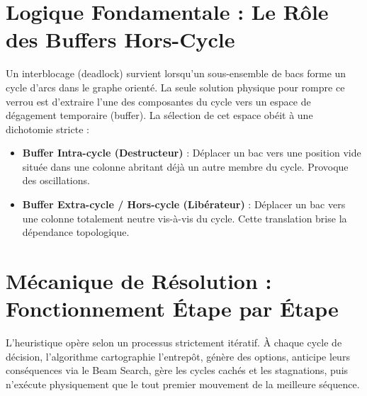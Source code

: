 \documentclass[11pt,a4paper]{article}
\begin{document}
\section{Logique Fondamentale : Le Rôle des Buffers Hors-Cycle}
Un interblocage (deadlock) survient lorsqu'un sous-ensemble de bacs forme un cycle d'arcs dans le graphe orienté. La seule solution physique pour rompre ce verrou est d'extraire l'une des composantes du cycle vers un espace de dégagement temporaire (buffer). La sélection de cet espace obéit à une dichotomie stricte :
\begin{itemize}
    \item \textbf{Buffer Intra-cycle (Destructeur)} : Déplacer un bac vers une position vide située dans une colonne abritant déjà un autre membre du cycle. Provoque des oscillations.
    \item \textbf{Buffer Extra-cycle / Hors-cycle (Libérateur)} : Déplacer un bac vers une colonne totalement neutre vis-à-vis du cycle. Cette translation brise la dépendance topologique.
\end{itemize}

\section{Mécanique de Résolution : Fonctionnement Étape par Étape}

L'heuristique opère selon un processus strictement itératif. À chaque cycle de décision, l'algorithme cartographie l'entrepôt, génère des options, anticipe leurs conséquences via le Beam Search, gère les cycles cachés et les stagnations, puis n'exécute physiquement que le tout premier mouvement de la meilleure séquence.
\end{document}
